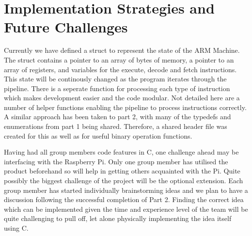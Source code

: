 \documentclass[11pt]{article}
\begin{document}
\section{Implementation Strategies and Future Challenges}

Currently we have defined a struct to represent the state of the ARM Machine. The struct contains a pointer to an array of bytes of memory, a pointer to an array of registers, and variables for the execute, decode and fetch instructions. This state will be continously changed as the program iterates through the pipeline. There is a seperate function for processing each type of instruction which makes development easier and the code modular. Not detailed here are a number of helper functions enabling the pipeline to process instructions correctly. A similar approach has been taken to part 2, with many of the typedefs and enumerations from part 1 being shared. Therefore, a shared header file was created for this as well as for useful binary operation functions. \newline

Having had all group members code features in C, one challenge ahead may be interfacing with the Raspberry Pi. Only one group member has utilised the product beforehand so will help in getting others acquainted with the Pi. Quite possibly the biggest challenge of the project will be the optional extension. Each group member has started individually brainstorming ideas and we plan to have a discussion following the successful completion of Part 2. Finding the correct idea which can be implemented given the time and experience level of the team will be quite challenging to pull off, let alone physically implementing the idea itself using C.
\end{document}
